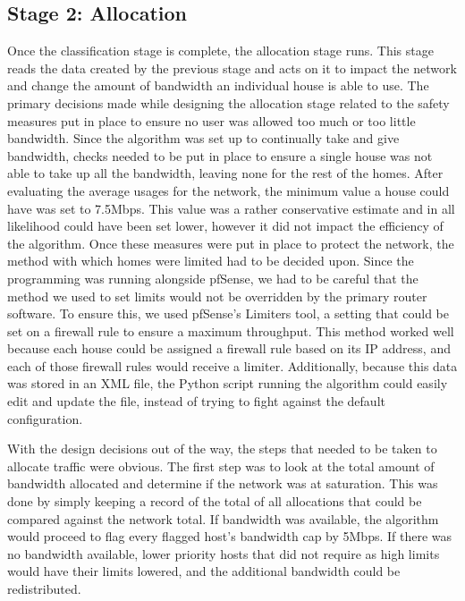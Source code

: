 \subsection{Stage 2: Allocation}
Once the classification stage is complete, the allocation stage runs.
This stage reads the data created by the previous stage and acts on it to impact the network and change the amount of bandwidth an individual house is able to use.
The primary decisions made while designing the allocation stage related to the safety measures put in place to ensure no user was allowed too much or too little bandwidth.
Since the algorithm was set up to continually take and give bandwidth, checks needed to be put in place to ensure a single house was not able to take up all the bandwidth, leaving none for the rest of the homes.
After evaluating the average usages for the network, the minimum value a house could have was set to 7.5Mbps.
This value was a rather conservative estimate and in all likelihood could have been set lower, however it did not impact the efficiency of the algorithm.
Once these measures were put in place to protect the network, the method with which homes were limited had to be decided upon.
Since the programming was running alongside pfSense, we had to be careful that the method we used to set limits would not be overridden by the primary router software.
To ensure this, we used pfSense's Limiters tool, a setting that could be set on a firewall rule to ensure a maximum throughput.
This method worked well because each house could be assigned a firewall rule based on its IP address, and each of those firewall rules would receive a limiter.
Additionally, because this data was stored in an XML file, the Python script running the algorithm could easily edit and update the file, instead of trying to fight against the default configuration.\par
With the design decisions out of the way, the steps that needed to be taken to allocate traffic were obvious.
The first step was to look at the total amount of bandwidth allocated and determine if the network was at saturation.
This was done by simply keeping a record of the total of all allocations that could be compared against the network total.
If bandwidth was available, the algorithm would proceed to flag every flagged host's bandwidth cap by 5Mbps.
If there was no bandwidth available, lower priority hosts that did not require as high limits would have their limits lowered, and the additional bandwidth could be redistributed.
